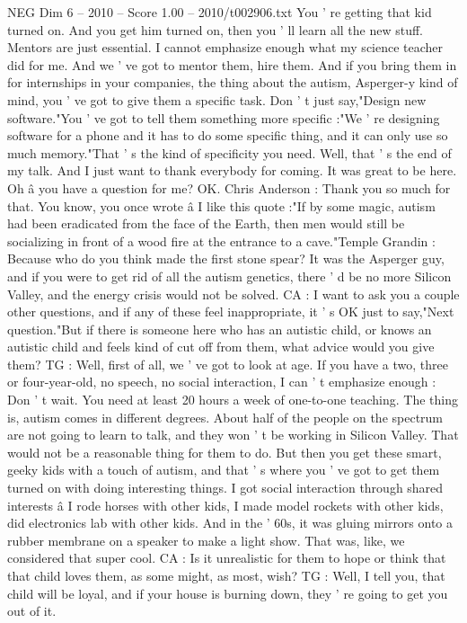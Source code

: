 \begin{textsample}{NEG Dim 6 – 2010 – Score 1.00 – 2010/t002906.txt}
You ' re getting that kid turned on.
And you get him turned on, then you ' ll learn all the new stuff.
Mentors are just essential.
I cannot emphasize enough what my science teacher did for me.
And we ' ve got to mentor them, hire them.
And if you bring them in for internships in your companies, the thing about the autism, Asperger-y kind of mind, you ' ve got to give them a specific task.
Don ' t just say,"Design new software."You ' ve got to tell them something more specific :"We ' re designing software for a phone and it has to do some specific thing, and it can only use so much memory."That ' s the kind of specificity you need.
Well, that ' s the end of my talk.
And I just want to thank everybody for coming.
It was great to be here.
Oh â you have a question for me?
OK.
Chris Anderson : Thank you so much for that.
You know, you once wrote â I like this quote :"If by some magic, autism had been eradicated from the face of the Earth, then men would still be socializing in front of a wood fire at the entrance to a cave."Temple Grandin : Because who do you think made the first stone spear?
It was the Asperger guy, and if you were to get rid of all the autism genetics, there ' d be no more Silicon Valley, and the energy crisis would not be solved.
CA : I want to ask you a couple other questions, and if any of these feel inappropriate, it ' s OK just to say,"Next question."But if there is someone here who has an autistic child, or knows an autistic child and feels kind of cut off from them, what advice would you give them?
TG : Well, first of all, we ' ve got to look at age.
If you have a two, three or four-year-old, no speech, no social interaction, I can ' t emphasize enough : Don ' t wait.
You need at least 20 hours a week of one-to-one teaching.
The thing is, autism comes in different degrees.
About half of the people on the spectrum are not going to learn to talk, and they won ' t be working in Silicon Valley.
That would not be a reasonable thing for them to do.
But then you get these smart, geeky kids with a touch of autism, and that ' s where you ' ve got to get them turned on with doing interesting things.
I got social interaction through shared interests â I rode horses with other kids, I made model rockets with other kids, did electronics lab with other kids.
And in the ' 60s, it was gluing mirrors onto a rubber membrane on a speaker to make a light show.
That was, like, we considered that super cool.
CA : Is it unrealistic for them to hope or think that that child loves them, as some might, as most, wish?
TG : Well, I tell you, that child will be loyal, and if your house is burning down, they ' re going to get you out of it.

\end{textsample}
